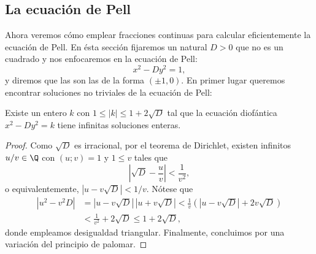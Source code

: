\documentclass[teoria-numeros.tex]{subfiles}
\begin{document}
\subsection{La ecuación de Pell}
Ahora veremos cómo emplear fracciones continuas para calcular eficientemente la ecuación de Pell.
En ésta sección fijaremos un natural $D > 0$ que no es un cuadrado y nos enfocaremos en la ecuación de Pell:
\begin{equation}
	x^2 - Dy^2 = 1,
	\label{eq:Pell_equation}
\end{equation}
y diremos que las  son las de la forma $(\pm 1, 0)$.
En primer lugar queremos encontrar soluciones no triviales de la ecuación de Pell:
\begin{lem}
	Existe un entero $k$ con $1 \le |k| \le 1 + 2\sqrt{D}$ tal que la ecuación diofántica $x^2 - Dy^2 = k$ tiene infinitas soluciones enteras.
\end{lem}
\begin{proof}
	Como $\sqrt{D}$ es irracional, por el teorema de Dirichlet, existen infinitos $u/v \in \Q$ con $(u; v) = 1$ y $1 \le v$ tales que
	$$ \left| \sqrt{D} - \frac{u}{v} \right| < \frac{1}{v^2}, $$
	o equivalentemente, $|u - v\sqrt{D}| < 1/v$. Nótese que
	\begin{align*}
		|u^2 - v^2D| &= |u - v\sqrt{D}| \, |u + v\sqrt{D}| < \frac{1}{v}(|u - v\sqrt{D}| + 2v\sqrt{D}) \\
			     &< \frac{1}{v^2} + 2\sqrt{D} \le 1 + 2\sqrt{D},
	\end{align*}
	donde empleamos desigualdad triangular.
	Finalmente, concluimos por una variación del principio de palomar.
\end{proof}
\end{document}
